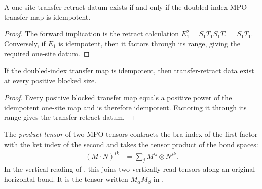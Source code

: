 \begin{lemma}%
    \label{thm:mpdo_one_site_transfer_retract_iff_zcl}
    \leanok
    A one-site transfer-retract datum exists if and only if the doubled-index
    MPO transfer map is idempotent.
\end{lemma}
\begin{proof}\leanok
    The forward implication is the retract calculation
    $E_1^2=S_1T_1S_1T_1=S_1T_1$. Conversely, if $E_1$ is idempotent, then
    it factors through its range, giving the required one-site datum.
\end{proof}

\begin{lemma}%
    \label{thm:mpdo_transfer_retract_of_zcl}
    \leanok
    If the doubled-index transfer map is idempotent, then transfer-retract data
    exist at every positive blocked size.
\end{lemma}
\begin{proof}\leanok
    Every positive blocked transfer map equals a positive power of the
    idempotent one-site map and is therefore idempotent. Factoring it through
    its range gives the transfer-retract datum.
\end{proof}

\begin{definition}%
    \label{def:mpdo_operator_product}
    \leanok
    The \emph{product tensor} of two MPO tensors contracts the bra index of
    the first factor with the ket index of the second and takes the tensor
    product of the bond spaces:
    \begin{align}
        (M\mathbin{\cdot}N)^{ik}
         & =\sum_j M^{ij}\otimes N^{jk}.
        \label{eq:rfp_product_tensor}
    \end{align}
    In the vertical reading of \cite[Section~4.5]{Cirac2016MPDO_arXiv}, this
    joins two vertically read tensors along an original horizontal bond.
    It is the tensor written $M_\alpha M_\beta$ in
    \cite[Theorem~4.14(iii)]{Cirac2016MPDO_arXiv}.
\end{definition}

